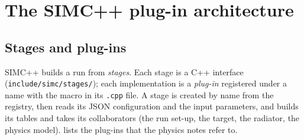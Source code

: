 \documentclass{simcnote}
\begin{document}
\section{The SIMC++ plug-in architecture}

\subsection{Stages and plug-ins}
SIMC++ builds a run from \emph{stages}. Each stage is a C++ interface (\texttt{include/simc/stages/}); each
implementation is a \emph{plug-in} registered under a name with the macro 
in its \texttt{.cpp} file. A stage is created by name from the registry, then  reads its
JSON configuration and the input parameters, and  builds its tables and takes its
collaborators (the run set-up, the target, the radiator, the physics model).  lists the plug-ins that
the physics notes refer to.
\end{document}
